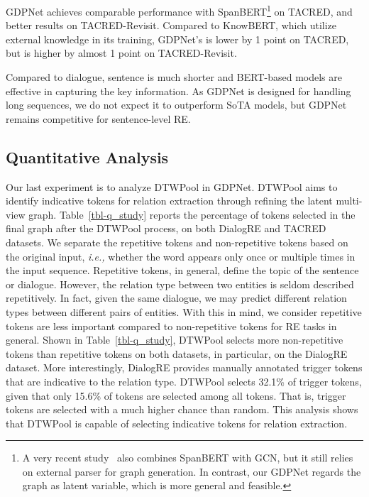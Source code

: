 \documentclass[letterpaper]{article} \usepackage{aaai21}  \usepackage{times}  \usepackage{helvet} \usepackage{courier}  \usepackage[hyphens]{url}  \usepackage{graphicx} \urlstyle{rm} \def\UrlFont{\rm}  \usepackage{graphicx}  \usepackage{natbib}  \usepackage{caption}
\newcommand{\ie}{\emph{i.e.,}\xspace}
\begin{document}
GDPNet achieves comparable performance with SpanBERT\footnote{A very recent study~\cite{chen2020efficient} also combines SpanBERT with GCN, but it still relies on external parser for graph generation. In contrast, our GDPNet regards the graph as latent variable, which is more general and feasible.} on TACRED, and better results on TACRED-Revisit. Compared to KnowBERT, which utilize external knowledge in its training, GDPNet's  is lower by 1 point on TACRED, but is higher by almost 1 point on TACRED-Revisit. 

Compared to dialogue, sentence is much shorter and BERT-based models are effective in capturing the key information. As GDPNet is designed for handling long sequences, we do not expect it to outperform SoTA models, but GDPNet remains competitive for sentence-level RE.  





\subsection{Quantitative Analysis}
Our last experiment is to analyze DTWPool in GDPNet. DTWPool aims to identify indicative tokens for relation extraction through refining the latent multi-view graph. Table~\ref{tbl-q_study} reports the percentage of tokens selected in the final graph after the DTWPool process, on both DialogRE and TACRED datasets. We separate the repetitive tokens and non-repetitive tokens based on the original input, \ie whether the word appears only once or multiple times in the input sequence. Repetitive tokens, in general, define the topic of the sentence or dialogue. However, the relation type between two entities is seldom described repetitively. In fact, given the same dialogue, we may predict different relation types between different pairs of entities. With this in mind, we consider repetitive tokens are less important compared to non-repetitive tokens for RE tasks in general. Shown in Table~\ref{tbl-q_study}, DTWPool selects more non-repetitive tokens than repetitive tokens on both datasets, in particular, on the DialogRE dataset. More interestingly, DialogRE provides manually annotated trigger tokens that are indicative to the relation type. DTWPool selects 32.1\% of trigger tokens, given that only 15.6\% of tokens are selected among all tokens. That is, trigger tokens are selected with a much higher chance than random. This analysis shows that DTWPool is capable of selecting indicative tokens for relation extraction.   
\end{document}
